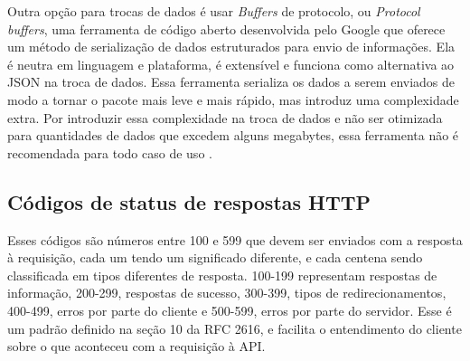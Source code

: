 Outra opção para trocas de dados é usar \emph{Buffers} de protocolo, ou \emph{Protocol buffers}, uma ferramenta de código aberto desenvolvida pelo Google que oferece um método de serialização de dados estruturados para envio de informações. Ela é neutra em linguagem e plataforma, é extensível e funciona como alternativa ao JSON na troca de dados. Essa ferramenta serializa os dados a serem enviados de modo a tornar o pacote mais leve e mais rápido, mas introduz uma complexidade extra. Por introduzir essa complexidade na troca de dados e não ser otimizada para quantidades de dados que excedem alguns megabytes, essa ferramenta não é recomendada para todo caso de uso \cite{google-protocol-buffers}.

\subsection{Códigos de status de respostas HTTP}
Esses códigos são números entre 100 e 599 que devem ser enviados com a resposta à requisição, cada um tendo um significado diferente, e cada centena sendo classificada em tipos diferentes de resposta. 100-199 representam respostas de informação, 200-299, respostas de sucesso, 300-399, tipos de redirecionamentos, 400-499, erros por parte do cliente e 500-599, erros por parte do servidor. Esse é um padrão definido na seção 10 da RFC 2616, e facilita o entendimento do cliente sobre o que aconteceu com a requisição à API. \cite{rfc_http_nielsen_1999, api-design-restfulapi}






